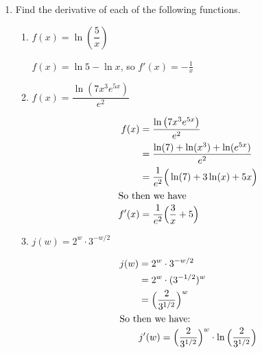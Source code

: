 \documentclass{article}
\begin{document}
\begin{enumerate}
\begin{enumerate}
    \begin{solution}
      $x=0$
    \end{solution}

  \end{enumerate}

\item 
  Find the derivative of each of the following functions. 

  \begin{enumerate}

  \item
    \begin{problem}[\stretch{0.25}]
      $f(x)=\ln \left(\dfrac{5}{x} \right)$
    \end{problem}

    \begin{solution}
      $f(x)=\ln5-\ln x$, so $f'(x)=-\frac{1}{x}$
    \end{solution}

  \item
    \begin{problem}[\stretch{0.25}]
      $f(x)= \dfrac{\ln \left(7x^3e^{5x} \right)}{e^2}$
    \end{problem}

    \begin{solution}
        \begin{align*}
            f(x) &= \dfrac{\ln \left(7x^3e^{5x} \right)}{e^2} \\
             &= \frac{\ln(7) + \ln(x^3) + \ln(e^{5x})}{e^2} \\
             &= \frac{1}{e^2}\Big(\ln(7)+ 3 \ln(x) + 5x\Big) \\
    \intertext{So then we have}
    f'(x) &= \frac{1}{e^2}\Big(\frac{3}{x} + 5\Big)
        \end{align*}
    \end{solution}

  \item
    \begin{problem}[\stretch{0.25}]
      $j(w) = 2^w \cdot 3^{-w/2}$
    \end{problem}

    \begin{solution}
        \begin{align*}
            j(w) &= 2^w \cdot 3^{-w/2} \\
            & = 2^w \cdot (3^{-1/2})^w \\
            & = \Big(\dfrac{2}{3^{1/2}}\Big)^w \\
        \intertext{So then we have:} 
        & j'(w) = \Big(\dfrac{2}{3^{1/2}}\Big)^w \cdot \ln\Big(\frac{2}{3^{1/2}}\Big) \\
        \end{align*}
    \end{solution}


\end{enumerate}
\end{enumerate}
\end{document}
